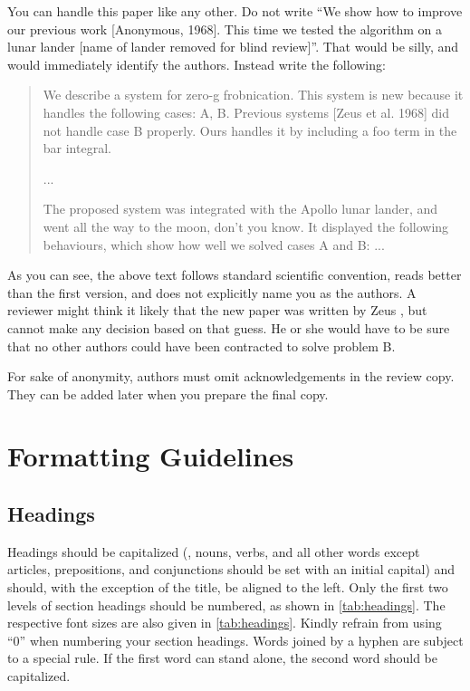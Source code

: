 \documentclass[runningheads]{llncs}
\begin{document}
You can handle this paper like any other.
Do not write ``We show how to improve our previous work [Anonymous, 1968].
This time we tested the algorithm on a lunar lander [name of lander removed for blind review]''.
That would be silly, and would immediately identify the authors.
Instead write the following:
\begin{quotation}
   We describe a system for zero-g frobnication.
   This system is new because it handles the following cases:
   A, B.  Previous systems [Zeus et al. 1968] did not  handle case B properly.
   Ours handles it by including a foo term in the bar integral.

   ...

   The proposed system was integrated with the Apollo lunar lander, and went all the way to the moon, don't you know.
   It displayed the following behaviours, which show how well we solved cases A and B: ...
\end{quotation}
As you can see, the above text follows standard scientific convention, reads better than the first version, and does not explicitly name you as the authors.
A reviewer might think it likely that the new paper was written by Zeus \etal, but cannot make any decision based on that guess.
He or she would have to be sure that no other authors could have been contracted to solve problem B.

For sake of anonymity, authors must omit acknowledgements in the review copy. 
They can be added later when you prepare the final copy.


\section{Formatting Guidelines}

\subsection{Headings}
Headings should be capitalized (\ie, nouns, verbs, and all other words except articles, prepositions, and conjunctions should be set with an initial capital) and should, with the exception of the title, be aligned to the left.
Only the first two levels of section headings should be numbered, as shown in \cref{tab:headings}.
The respective font sizes are also given in \cref{tab:headings}. 
Kindly refrain from using ``0'' when numbering your section headings.
Words joined by a hyphen are subject to a special rule. 
If the first word can stand alone, the second word should be capitalized.
\end{document}
